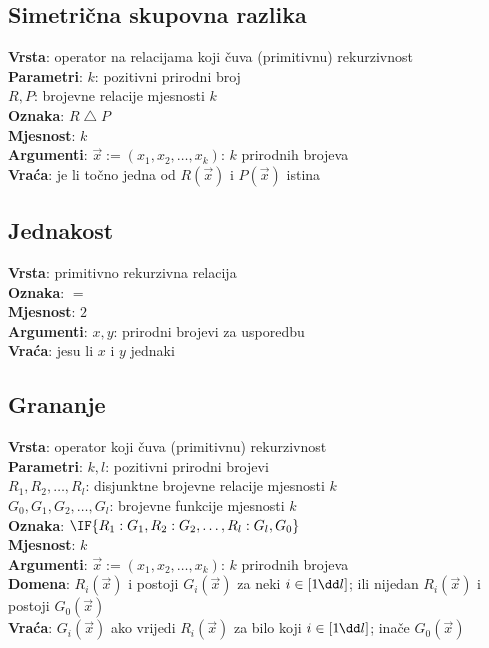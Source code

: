 \subsection{Simetrična skupovna razlika}
\textbf{Vrsta}: operator na relacijama koji čuva (primitivnu) rekurzivnost\\
\textbf{Parametri}: $k$: pozitivni prirodni broj\\
$R,P$: brojevne relacije mjesnosti $k$\\
\textbf{Oznaka}: $R\mathbin{\triangle}P$\\
\textbf{Mjesnost}: $k$\\
\textbf{Argumenti}: $\vec x:=(x_1,x_2,\dots,x_k)$: $k$ prirodnih brojeva\\
\textbf{Vraća}: je li točno jedna od $R(\vec x)$ i $P(\vec x)$ istina

\subsection{Jednakost}
\textbf{Vrsta}: primitivno rekurzivna relacija\\
\textbf{Oznaka}: $=$\\
\textbf{Mjesnost}: $2$\\
\textbf{Argumenti}: $x,y$: prirodni brojevi za usporedbu\\
\textbf{Vraća}: jesu li $x$ i $y$ jednaki

\subsection{Grananje}
\textbf{Vrsta}: operator koji čuva (primitivnu) rekurzivnost\\
\textbf{Parametri}: $k,l$: pozitivni prirodni brojevi\\
$R_1,R_2,\dots,R_l$: disjunktne brojevne relacije mjesnosti $k$\\
$G_0,G_1,G_2,\dots,G_l$: brojevne funkcije mjesnosti $k$\\
\textbf{Oznaka}: $\IF{R_1:G_1,R_2:G_2,\dots,R_l:G_l,G_0}$\\
\textbf{Mjesnost}: $k$\\
\textbf{Argumenti}: $\vec x:=(x_1,x_2,\dots,x_k)$: $k$ prirodnih brojeva\\
\textbf{Domena}: $R_i(\vec x)$ i postoji $G_i(\vec x)$ za neki $i\in[1\mspace{-1mu}\dd l]$; ili nijedan $R_i(\vec x)$ i postoji $G_0(\vec x)$\\
\textbf{Vraća}: $G_i(\vec x)$ ako vrijedi $R_i(\vec x)$ za bilo koji $i\in[1\mspace{-1mu}\dd l]$; inače $G_0(\vec x)$

